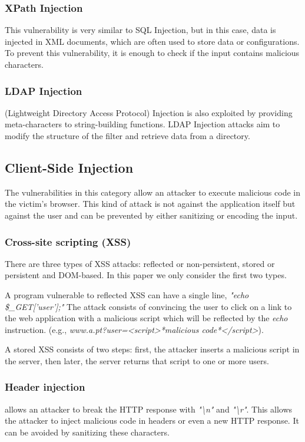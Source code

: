 \subsubsection{XPath Injection} This vulnerability is very similar to SQL Injection, but in this case, data is injected in XML documents, which are often used to store data or configurations. To prevent this vulnerability, it is enough to check if the input contains malicious characters.

\subsubsection{LDAP Injection} (Lightweight Directory Access Protocol) Injection is also exploited by providing meta-characters to string-building functions. LDAP Injection attacks aim to modify the structure of the filter and retrieve data from a directory.

\subsection{Client-Side Injection}
The vulnerabilities in this category allow an attacker to execute malicious code in the victim's browser. This kind of attack is not against the application itself but against the user and can be prevented by either sanitizing or encoding the input.
\subsubsection{Cross-site scripting (XSS)}
There are three types of XSS attacks: reflected or non-persistent, stored or persistent and DOM-based. In this paper we only consider the first two types.

A program vulnerable to reflected XSS can have a single line, \textit{"echo \$\_GET['user'];"} 
The attack consists of convincing the user to click on a link to the web application with a malicious script which will be reflected by the \textit{echo} instruction. (e.g., \textit{www.a.pt?user=<script>*malicious code*</script>}).

A stored XSS consists of two steps: first, the attacker inserts a malicious script in the server, then later, the server returns that script to one or more users.

\subsubsection{Header injection} allows an attacker to break the HTTP  response with \textit{"\textbackslash n"} and \textit{"\textbackslash r"}. This allows the attacker to inject malicious code in headers or even a new HTTP  response. It can be avoided by sanitizing these characters.

